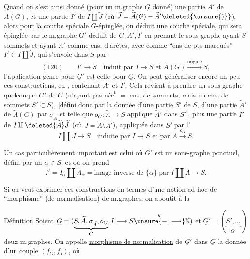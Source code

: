 Quand on s'est ainsi donné (pour un m.graphe $\underline G$ donné) une partie $A'$ de $A(G)$, et une partie $I'$ de $I\amalg\widetilde J$ (où $\widetilde J=\widetilde A(G)-\widetilde A'\deleted{\unsure{)}}$), alors pour la courbe spéciale $G$-épinglée, on déduit une courbe spéciale, qui sera épinglée par le m.graphe $\underline G'$ déduit de $\underline G,A',I'$ en prenant le sous-graphe  ayant  $S$ sommets et ayant $A'$ comme ens. d'arêtes, avec comme ``ens de pts marqués'' $I'\subset I\amalg\widetilde J$, qui s'envoie dans $S$  par
\[
(120)\qquad I'\longrightarrow S\quad\text{induit par }I\longrightarrow S\text{ et }\widetilde A(G)\xrightarrow{\text{origine}}S,
\]
l'application genre pour $\underline G'$ est celle pour $\underline G$.
On peut généraliser encore un peu ces constructions, en    , contenant $A'$ et $I'$. Cela revient à prendre un sous-graphe \uline{quelconque} $G'$ de $G$ (n'ayant pas $\text{néc}^{\text{t}}$  $=$ ens. de sommets, mais un ens. de sommets $S'\subset S$), [défini donc par la donnée d'une partie $S'$ de $S$, d'une partie $\widetilde A'$ de $\widetilde A(G)$  par $\sigma_{\widetilde A}$ et telle que $o_G:\widetilde A\longrightarrow S$ applique $\widetilde A'$ dans $S'$], plus une partie $I'$ de $I\amalg\deleted{\widetilde A}\widetilde J$ (où $\widetilde J=\widetilde A\setminus\widetilde A'$), appliquée dans $S'$ par l'
\[
I\amalg\widetilde J\longrightarrow S\quad\text{induite par }I\longrightarrow S\text{ et par }\widetilde A\xrightarrow{o_G}S.
\]

Un cas particulièrement important est celui où $G'$ est un sous-graphe ponctuel, défini par un $\alpha\in S$,  et où on prend
\[
I'=I_\alpha\amalg\widetilde A_\alpha=\text{image inverse de }\{\alpha\}\text{ par }I\amalg\widetilde A\longrightarrow S.
\]

Si on veut exprimer ces constructions en termes d'une notion ad-hoc de
``morphisme'' (de normalisation) de m.graphes, on aboutit à la

\uline{Définition} Soient $\underline G=(\underbrace{S,\widetilde A,\sigma_{\widetilde A},o_G}_{G},I\longrightarrow S\overset{g}{\unsure{-|\longrightarrow}}\mathbb N)$ et $\underline G'=(\underbrace{S',\ldots}_{G'})$ deux m.graphes. On appelle \uline{morphisme de normalisation} de $\underline G'$ dans $\underline G$ la donnée d'un couple  $(f_G,f_I)$, où

